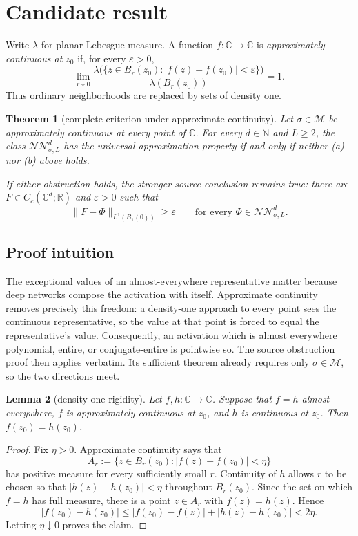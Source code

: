 \documentclass[11pt]{article}
\newtheorem{theorem}{Theorem}
\newtheorem{lemma}[theorem]{Lemma}
\theoremstyle{remark}
\newcommand{\C}{\mathbb C}
\newcommand{\R}{\mathbb R}
\newcommand{\N}{\mathbb N}
\newcommand{\M}{\mathcal M}
\newcommand{\NN}{\mathcal{NN}}
\begin{document}
\section{Candidate result}

Write $\lambda$ for planar Lebesgue measure.  A function
$f:\C\to\C$ is \emph{approximately continuous at $z_0$} if, for every
$\varepsilon>0$,
\[
 \lim_{r\downarrow0}
 \frac{\lambda\bigl(\{z\in B_r(z_0):
       |f(z)-f(z_0)|<\varepsilon\}\bigr)}{\lambda(B_r(z_0))}=1.
\]
Thus ordinary neighborhoods are replaced by sets of density one.

\begin{theorem}[complete criterion under approximate continuity]
\label{thm:main}
Let $\sigma\in\M$ be approximately continuous at every point of $\C$.
For every $d\in\N$ and $L\ge2$, the class $\NN^d_{\sigma,L}$ has the
universal approximation property if and only if neither \emph{(a)} nor
\emph{(b)} above holds.

If either obstruction holds, the stronger source conclusion remains true:
there are $F\in C_c(\C^d;\R)$ and $\varepsilon>0$ such that
\[
  \|F-\Phi\|_{L^1(B_1(0))}\ge\varepsilon
  \qquad\text{for every }\Phi\in\NN^d_{\sigma,L}.
\]
\end{theorem}

\subsection*{Proof intuition}

The exceptional values of an almost-everywhere representative matter because
deep networks compose the activation with itself.  Approximate continuity
removes precisely this freedom: a density-one approach to every point sees
the continuous representative, so the value at that point is forced to equal
the representative's value.  Consequently, an activation which is almost
everywhere polynomial, entire, or conjugate-entire is pointwise so.  The
source obstruction proof then applies verbatim.  Its sufficient theorem
already requires only $\sigma\in\M$, so the two directions meet.

\begin{lemma}[density-one rigidity]
\label{lem:rigidity}
Let $f,h:\C\to\C$.  Suppose that $f=h$ almost everywhere, $f$ is
approximately continuous at $z_0$, and $h$ is continuous at $z_0$.
Then $f(z_0)=h(z_0)$.
\end{lemma}

\begin{proof}
Fix $\eta>0$.  Approximate continuity says that
\[
 A_r:=\{z\in B_r(z_0):|f(z)-f(z_0)|<\eta\}
\]
has positive measure for every sufficiently small $r$.  Continuity of $h$
allows $r$ to be chosen so that $|h(z)-h(z_0)|<\eta$ throughout
$B_r(z_0)$.  Since the set on which $f=h$ has full measure, there is a point
$z\in A_r$ with $f(z)=h(z)$.  Hence
\[
 |f(z_0)-h(z_0)|
 \le |f(z_0)-f(z)|+|h(z)-h(z_0)|<2\eta.
\]
Letting $\eta\downarrow0$ proves the claim.
\end{proof}
\end{document}
